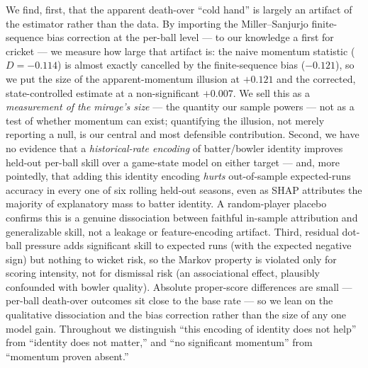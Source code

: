 We find, first, that the apparent death-over ``cold hand'' is largely an artifact
of the estimator rather than the data. By importing the Miller--Sanjurjo
finite-sequence bias correction at the per-ball level --- to our knowledge a first
for cricket --- we measure how large that artifact is: the naive momentum
statistic ($D=-0.114$) is almost exactly cancelled by the finite-sequence bias
($-0.121$), so we put the size of the apparent-momentum illusion at $+0.121$ and
the corrected, state-controlled estimate at a non-significant $+0.007$. We sell
this as a \emph{measurement of the mirage's size} --- the quantity our sample
powers --- not as a test of whether momentum can exist; quantifying the illusion,
not merely reporting a null, is our central and most defensible contribution.
Second,
we have no evidence that a \emph{historical-rate encoding} of batter/bowler
identity improves held-out per-ball skill over a game-state model on either target
--- and, more pointedly, that adding this identity encoding \emph{hurts}
out-of-sample expected-runs accuracy in every one of six rolling held-out seasons,
even as SHAP attributes the majority of explanatory mass to batter identity. A
random-player placebo confirms this is a genuine dissociation between faithful
in-sample attribution and generalizable skill, not a leakage or feature-encoding
artifact. Third, residual dot-ball pressure adds significant skill to expected runs
(with the expected negative sign) but nothing to wicket risk, so the Markov
property is violated only for scoring intensity, not for dismissal risk (an
associational effect, plausibly confounded with bowler quality). Absolute
proper-score differences are small --- per-ball death-over outcomes sit close to
the base rate --- so we lean on the qualitative dissociation and the bias
correction rather than the size of any one model gain. Throughout we distinguish
``this encoding of identity does not help'' from ``identity does not matter,'' and
``no significant momentum'' from ``momentum proven absent.''

